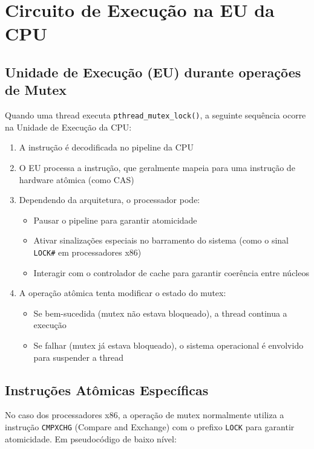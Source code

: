 \documentclass[12pt]{article}
\begin{document}
\section{Circuito de Execução na EU da CPU}

\subsection{Unidade de Execução (EU) durante operações de Mutex}

Quando uma thread executa \texttt{pthread\_mutex\_lock()}, a seguinte sequência ocorre na Unidade de Execução da CPU:

\begin{enumerate}
    \item A instrução é decodificada no pipeline da CPU
    \item O EU processa a instrução, que geralmente mapeia para uma instrução de hardware atômica (como CAS)
    \item Dependendo da arquitetura, o processador pode:
        \begin{itemize}
            \item Pausar o pipeline para garantir atomicidade
            \item Ativar sinalizações especiais no barramento do sistema (como o sinal \texttt{LOCK\#} em processadores x86)
            \item Interagir com o controlador de cache para garantir coerência entre núcleos
        \end{itemize}
    \item A operação atômica tenta modificar o estado do mutex:
        \begin{itemize}
            \item Se bem-sucedida (mutex não estava bloqueado), a thread continua a execução
            \item Se falhar (mutex já estava bloqueado), o sistema operacional é envolvido para suspender a thread
        \end{itemize}
\end{enumerate}

\subsection{Instruções Atômicas Específicas}

No caso dos processadores x86, a operação de mutex normalmente utiliza a instrução \texttt{CMPXCHG} (Compare and Exchange) com o prefixo \texttt{LOCK} para garantir atomicidade. Em pseudocódigo de baixo nível:
\end{document}
